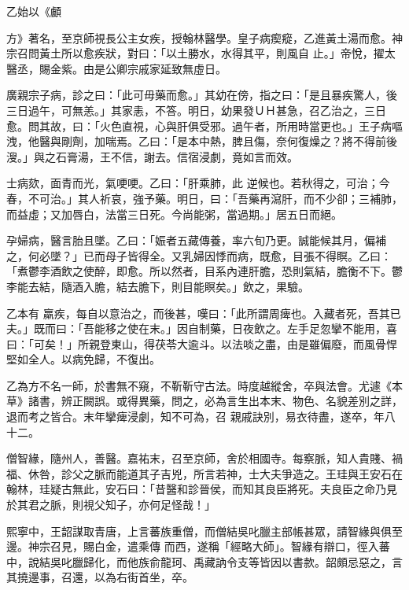 \begin{pinyinscope}
 乙始以《顱
 
  
   
  
 
 方》著名，至京師視長公主女疾，授翰林醫學。皇子病瘈瘲，乙進黃土湯而愈。神宗召問黃土所以愈疾狀，對曰：「以土勝水，水得其平，則風自
 止。」帝悅，擢太醫丞，賜金紫。由是公卿宗戚家延致無虛日。



 廣親宗子病，診之曰：「此可毋藥而愈。」其幼在傍，指之曰：「是且暴疾驚人，後三日過午，可無恙。」其家恚，不答。明日，幼果發ＵＨ甚急，召乙治之，三日愈。問其故，曰：「火色直視，心與肝俱受邪。過午者，所用時當更也。」王子病嘔洩，他醫與剛劑，加喘焉。乙曰：「是本中熱，脾且傷，奈何復燥之？將不得前後溲。」與之石膏湯，王不信，謝去。信宿浸劇，竟如言而效。



 士病欬，面青而光，氣哽哽。乙曰：「肝乘肺，此
 逆候也。若秋得之，可治；今春，不可治。」其人祈哀，強予藥。明日，曰：「吾藥再瀉肝，而不少卻；三補肺，而益虛；又加唇白，法當三日死。今尚能粥，當過期。」居五日而絕。



 孕婦病，醫言胎且墜。乙曰：「娠者五藏傳養，率六旬乃更。誠能候其月，偏補之，何必墜？」已而母子皆得全。又乳婦因悸而病，既愈，目張不得瞑。乙曰：「煮鬱李酒飲之使醉，即愈。所以然者，目系內連肝膽，恐則氣結，膽衡不下。鬱李能去結，隨酒入膽，結去膽下，則目能瞑矣。」飲之，果驗。



 乙本有
 羸疾，每自以意治之，而後甚，嘆曰：「此所謂周痺也。入藏者死，吾其已夫。」既而曰：「吾能移之使在末。」因自制藥，日夜飲之。左手足忽攣不能用，喜曰：「可矣！」所親登東山，得茯苓大逾斗。以法啖之盡，由是雖偏廢，而風骨悍堅如全人。以病免歸，不復出。



 乙為方不名一師，於書無不窺，不靳靳守古法。時度越縱舍，卒與法會。尤遽《本草》諸書，辨正闕誤。或得異藥，問之，必為言生出本末、物色、名貌差別之詳，退而考之皆合。末年攣痺浸劇，知不可為，召
 親戚訣別，易衣待盡，遂卒，年八十二。



 僧智緣，隨州人，善醫。嘉祐末，召至京師，舍於相國寺。每察脈，知人貴賤、禍福、休咎，診父之脈而能道其子吉兇，所言若神，士大夫爭造之。王珪與王安石在翰林，珪疑古無此，安石曰：「昔醫和診晉侯，而知其良臣將死。夫良臣之命乃見於其君之脈，則視父知子，亦何足怪哉！」



 熙寧中，王韶謀取青唐，上言蕃族重僧，而僧結吳叱臘主部帳甚眾，請智緣與俱至邊。神宗召見，賜白金，遣乘傳
 而西，遂稱「經略大師」。智緣有辯口，徑入蕃中，說結吳叱臘歸化，而他族俞龍珂、禹藏訥令支等皆因以書款。韶頗忌惡之，言其撓邊事，召還，以為右街首坐，卒。




\end{pinyinscope}

